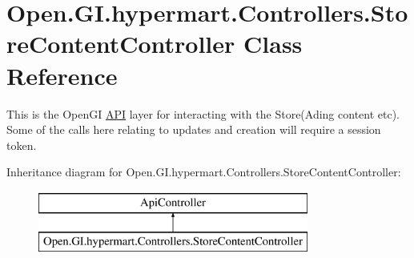 \hypertarget{class_open_1_1_g_i_1_1hypermart_1_1_controllers_1_1_store_content_controller}{}\section{Open.\+G\+I.\+hypermart.\+Controllers.\+Store\+Content\+Controller Class Reference}
\label{class_open_1_1_g_i_1_1hypermart_1_1_controllers_1_1_store_content_controller}


This is the Open\+G\+I \hyperlink{namespace_open_1_1_g_i_1_1hypermart_1_1_controllers_1_1_a_p_i}{A\+P\+I} layer for interacting with the Store(\+Ading content etc). Some of the calls here relating to updates and creation will require a session token.  


Inheritance diagram for Open.\+G\+I.\+hypermart.\+Controllers.\+Store\+Content\+Controller\+:\begin{figure}[H]
\begin{center}
\leavevmode
\includegraphics[height=2.000000cm]{class_open_1_1_g_i_1_1hypermart_1_1_controllers_1_1_store_content_controller}
\end{center}
\end{figure}
